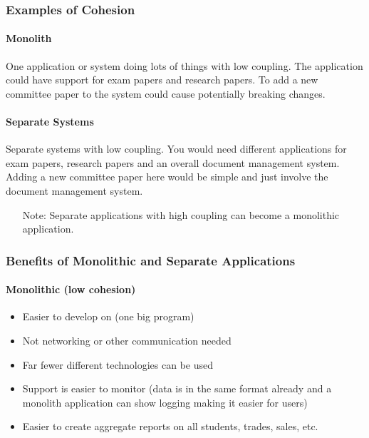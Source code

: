 \subsubsection{Examples of Cohesion}\label{ssub:examples_of_cohesion}

\paragraph{Monolith}\label{par:monolith}

One application or system doing lots of things with low coupling.
The application could have support for exam papers and research papers.
To add a new committee paper to the system could cause potentially breaking changes.

\paragraph{Separate Systems}\label{par:separate_systems}

Separate systems with low coupling.
You would need different applications for exam papers, research papers and an overall document management system.
Adding a new committee paper here would be simple and just involve the document management system.

\begin{note}
    \begin{itemize}
        \item[Note:] Separate applications with high coupling can become a monolithic application.
    \end{itemize}
\end{note}

\subsubsection{Benefits of Monolithic and Separate Applications}\label{ssub:benefits_of_monolithic_and_separate_applications}

\paragraph{Monolithic (low cohesion)}\label{par:monolithic_low_cohesion_}

\begin{itemize}
    \item Easier to develop on (one big program)
    \item Not networking or other communication needed
    \item Far fewer different technologies can be used
    \item Support is easier to monitor (data is in the same format already and a monolith application can show logging making it easier for users)
    \item Easier to create aggregate reports on all students, trades, sales, etc.
\end{itemize}

